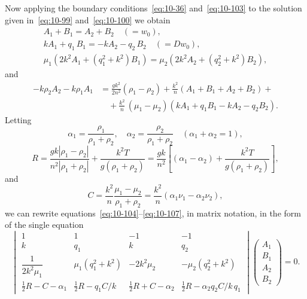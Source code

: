 Now applying the boundary conditions~\eqref{eq:10-36} and~\eqref{eq:10-103} to the solution given in~\eqref{eq:10-99} and~\eqref{eq:10-100} we obtain
\begin{gather}
A_1+B_1 = A_2+B_2 \quad (= w_0), \label{eq:10-104}\\
kA_1+q_1\,B_1 = -kA_2-q_2\,B_2 \quad (= Dw_0), \label{eq:10-105}\\
\mu_1(2k^2A_1+(q_1^2+k^2)B_1) = \mu_2(2k^2A_2+(q_2^2+k^2)B_2), \label{eq:10-106}
\end{gather}
and
\begin{align}
\label{eq:10-107}
-k\rho_2A_2-k\rho_1A_1 &= \frac{gk^2}{2n^2}(\rho_1-\rho_2) + \frac{k^2}{n}(A_1+B_1+A_2+B_2) + \nonumber\\
&\quad + \frac{k^2}{n}\,(\mu_1-\mu_2)(kA_1+q_1B_1-kA_2-q_2B_2).
\end{align}
Letting
\begin{equation}
\label{eq:10-108}
\alpha_1 = \frac{\rho_1}{\rho_1+\rho_2}, \quad \alpha_2 = \frac{\rho_2}{\rho_1+\rho_2} \quad (\alpha_1+\alpha_2 = 1),
\end{equation}
\begin{equation}
\label{eq:10-109}
R = \frac{gk|\rho_1-\rho_2|}{n^2|\rho_1+\rho_2|} + \frac{k^2T}{g(\rho_1+\rho_2)} = \frac{gk}{n^2}\!\left[(\alpha_1-\alpha_2)+\frac{k^2T}{g(\rho_1+\rho_2)}\right]\!,
\end{equation}
and
\begin{equation}
\label{eq:10-110}
C = \frac{k^2}{n}\frac{\mu_1-\mu_2}{\rho_1+\rho_2} = \frac{k^2}{n}(\alpha_1\nu_1-\alpha_2\nu_2),
\end{equation}
we can rewrite equations~\eqref{eq:10-104}--\eqref{eq:10-107}, in matrix notation, in the form of the single equation
\begin{equation}
\label{eq:10-111}
\begin{vmatrix}
1 & 1 & -1 & -1 \\[3pt]
k & q_1 & k & q_2 \\[3pt]
\dfrac{1}{2k^2\mu_1} & \mu_1(q_1^2+k^2) & -2k^2\mu_2 & -\mu_2(q_2^2+k^2) \\[6pt]
\frac{1}{2}R-C-\alpha_1 & \frac{1}{2}R-q_1C/k & \frac{1}{2}R+C-\alpha_2 & \frac{1}{2}R-\alpha_2q_2C/k\,q_1
\end{vmatrix}\!\begin{pmatrix} A_1 \\ B_1 \\ A_2 \\ B_2 \end{pmatrix} = 0.
\end{equation}
